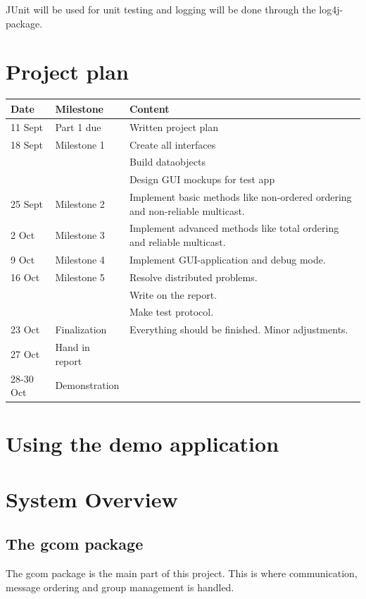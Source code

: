 \documentclass[english]{article}
\begin{document}
JUnit will be used for unit testing and logging will be done through the log4j-package. 

\section{Project plan}
\begin{tabular}{|l|l|p{7.5cm}|}
\hline
Date	&	Milestone	&	Content \\
\hline
11 Sept	&	Part 1 due	&	Written project plan \\
18 Sept &	Milestone 1 &	Create all interfaces \\ 
						&&	Build dataobjects \\
						&&	Design GUI mockups for test app \\
25 Sept &	Milestone 2 & 	Implement basic methods like non-ordered ordering and non-reliable multicast. \\
2 Oct	&	Milestone 3 & 	Implement advanced methods like total ordering and reliable multicast. \\
9 Oct	&	Milestone 4 & 	Implement GUI-application and debug mode. \\
16 Oct	&	Milestone 5 & 	Resolve distributed problems. \\ && Write on the report.\\ && Make test protocol. \\
23 Oct	&	Finalization 	& Everything should be finished. Minor adjustments. \\
27 Oct	&	Hand in report 	& \\
28-30 Oct & Demonstration	& \\
\hline
\end{tabular}


\section{Using the demo application}


\section{System Overview}

\subsection{The gcom package}
The gcom package is the main part of this project. This is where communication, message ordering and group management is handled. 
\end{document}
